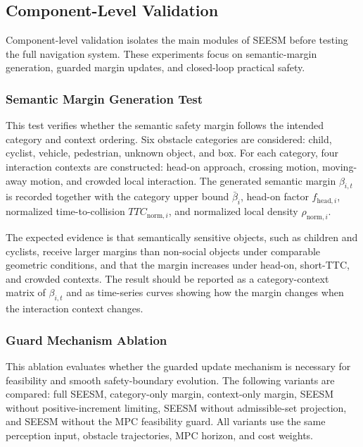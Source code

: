 \documentclass[journal]{IEEEtranTIE}
\begin{document}
    \subsection{Component-Level Validation}
    \label{sec:Component-level-validation}
    Component-level validation isolates the main modules of SEESM before testing
    the full navigation system. These experiments focus on semantic-margin
    generation, guarded margin updates, and closed-loop practical safety.

    \subsubsection{Semantic Margin Generation Test}
    This test verifies whether the semantic safety margin follows the intended
    category and context ordering. Six obstacle categories are considered:
    child, cyclist, vehicle, pedestrian, unknown object, and box. For each
    category, four interaction contexts are constructed: head-on approach,
    crossing motion, moving-away motion, and crowded local interaction. The
    generated semantic margin $\beta_{i,t}$ is recorded together with the
    category upper bound $\bar{\beta}_i$, head-on factor
    $f_{\mathrm{head},i}$, normalized time-to-collision
    $TTC_{\mathrm{norm},i}$, and normalized local density
    $\rho_{\mathrm{norm},i}$.

    The expected evidence is that semantically sensitive objects, such as
    children and cyclists, receive larger margins than non-social objects under
    comparable geometric conditions, and that the margin increases under
    head-on, short-TTC, and crowded contexts. The result should be reported as a
    category-context matrix of $\beta_{i,t}$ and as time-series curves showing
    how the margin changes when the interaction context changes.

    \subsubsection{Guard Mechanism Ablation}
    This ablation evaluates whether the guarded update mechanism is necessary
    for feasibility and smooth safety-boundary evolution. The following variants
    are compared: full SEESM, category-only margin, context-only margin, SEESM
    without positive-increment limiting, SEESM without admissible-set projection,
    and SEESM without the MPC feasibility guard. All variants use the same
    perception input, obstacle trajectories, MPC horizon, and cost weights.
\end{document}
